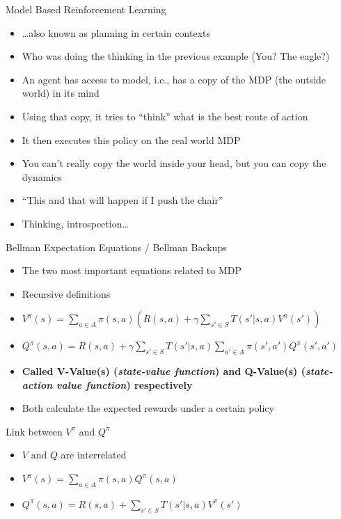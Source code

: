 \documentclass[]{beamer}
\providecommand{\tightlist}{%
  \setlength{\itemsep}{0pt}\setlength{\parskip}{0pt}}
\begin{document}
\begin{frame}{Model Based Reinforcement Learning}

\begin{itemize}
\tightlist
\item
  \ldots{}also known as planning in certain contexts
\item
  Who was doing the thinking in the previous example (You? The eagle?)
\item
  An agent has access to model, i.e., has a copy of the MDP (the outside
  world) in its mind
\item
  Using that copy, it tries to ``think'' what is the best route of
  action
\item
  It then executes this policy on the real world MDP
\item
  You can't really copy the world inside your head, but you can copy the
  dynamics
\item
  ``This and that will happen if I push the chair''
\item
  Thinking, introspection\ldots{}
\end{itemize}

\end{frame}

\begin{frame}{Bellman Expectation Equations / Bellman Backups}

\begin{itemize}
\tightlist
\item
  The two most important equations related to MDP
\item
  Recursive definitions
\item
  \(V^\pi (s) = \sum\limits_{a \in A}\pi(s,a) \left( R(s,a) + \gamma\sum\limits_{s' \in S}T(s'|s,a) V^\pi(s') \right)\)
\item
  \(Q^\pi (s,a) = R(s,a) + \gamma\sum\limits_{s' \in S} T(s'|s,a) \sum\limits_{a' \in A} \pi(s',a')Q^\pi(s',a')\)
\item
  \textbf{Called V-Value(s) (\emph{state-value function}) and Q-Value(s)
  (\emph{state-action value function}) respectively}
\item
  Both calculate the expected rewards under a certain policy
\end{itemize}

\end{frame}

\begin{frame}{Link between \(V^\pi\) and \(Q^\pi\)}

\begin{itemize}
\tightlist
\item
  \(V\) and \(Q\) are interrelated
\item
  \(V^\pi(s) = \sum\limits_{a \in A} \pi(s,a) Q^\pi(s,a)\)
\item
  \(Q^\pi(s,a) = R(s,a) + \sum\limits_{s' \in S} T(s'|s,a) V^\pi(s')\)
\end{itemize}

\end{frame}
\end{document}
